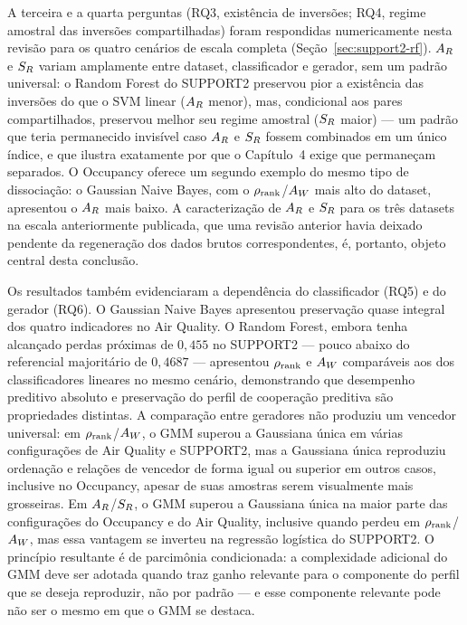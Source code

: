 A terceira e a quarta perguntas (RQ3, existência de inversões; RQ4, regime amostral das inversões compartilhadas) foram respondidas numericamente nesta revisão para os quatro cenários de escala completa (Seção~\ref{sec:support2-rf}). $A_R$ e $S_R$ variam amplamente entre dataset, classificador e gerador, sem um padrão universal: o Random Forest do SUPPORT2 preservou pior a existência das inversões do que o SVM linear ($A_R$ menor), mas, condicional aos pares compartilhados, preservou melhor seu regime amostral ($S_R$ maior) --- um padrão que teria permanecido invisível caso $A_R$ e $S_R$ fossem combinados em um único índice, e que ilustra exatamente por que o Capítulo~4 exige que permaneçam separados. O Occupancy oferece um segundo exemplo do mesmo tipo de dissociação: o Gaussian Naive Bayes, com o $\rho_{\mathrm{rank}}$/$A_W$ mais alto do dataset, apresentou o $A_R$ mais baixo. A caracterização de $A_R$ e $S_R$ para os três datasets na escala anteriormente publicada, que uma revisão anterior havia deixado pendente da regeneração dos dados brutos correspondentes, é, portanto, objeto central desta conclusão.

Os resultados também evidenciaram a dependência do classificador (RQ5) e do gerador (RQ6). O Gaussian Naive Bayes apresentou preservação quase integral dos quatro indicadores no Air Quality. O Random Forest, embora tenha alcançado perdas próximas de $0{,}455$ no SUPPORT2 --- pouco abaixo do referencial majoritário de $0{,}4687$ --- apresentou $\rho_{\mathrm{rank}}$ e $A_W$ comparáveis aos dos classificadores lineares no mesmo cenário, demonstrando que desempenho preditivo absoluto e preservação do perfil de cooperação preditiva são propriedades distintas. A comparação entre geradores não produziu um vencedor universal: em $\rho_{\mathrm{rank}}$/$A_W$, o GMM superou a Gaussiana única em várias configurações de Air Quality e SUPPORT2, mas a Gaussiana única reproduziu ordenação e relações de vencedor de forma igual ou superior em outros casos, inclusive no Occupancy, apesar de suas amostras serem visualmente mais grosseiras. Em $A_R$/$S_R$, o GMM superou a Gaussiana única na maior parte das configurações do Occupancy e do Air Quality, inclusive quando perdeu em $\rho_{\mathrm{rank}}$/$A_W$, mas essa vantagem se inverteu na regressão logística do SUPPORT2. O princípio resultante é de parcimônia condicionada: a complexidade adicional do GMM deve ser adotada quando traz ganho relevante para o componente do perfil que se deseja reproduzir, não por padrão --- e esse componente relevante pode não ser o mesmo em que o GMM se destaca.

